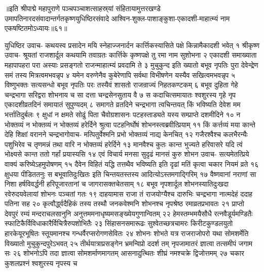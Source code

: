 ॥इति श्रीपाद्मे महापुराणे पञ्चपञ्चाशत्साहस्र्यां संहितायामुत्तरखण्डे उमापतिनारदसंवादान्तर्गतकृष्णयुधिष्ठिरसंवादे आश्विन-शुक्ल-पाशाङ्कुशा-एकादशी-माहात्म्यं नाम एकषष्टितमोऽध्यायः॥६१॥



युधिष्ठिर उवाच-
कथयस्व प्रसादेन मयि स्नेहाज्जनार्दन 
कार्त्तिकस्यासिते पक्षे किन्नामैकादशी भवेत् १
श्रीकृष्ण उवाच-
श्रूयतां राजशार्दूल कथयामि तवाग्रतः 
कार्त्तिके कृष्णपक्षे तु रमा नाम सुशोभना २
एकादशी समाख्याता महापापहरा परा 
अस्याः प्रसङ्गतो राजन्माहात्म्यं प्रवदामि ते ३
मुचुकुन्द इति ख्यातो बभूव नृपतिः पुरा 
देवेन्द्रेण समं तस्य मित्रत्वमभवन्नृप ४
यमेन वरुणेनैव कुबेरेणापि सर्वथा 
विभीषणेन यस्यैव सखित्वमभवन्नृप ५
विष्णुभक्तः सत्यसन्धो बभूव नृपतिः परः 
तस्यैवं शासतो राजन्राज्यं निहतकण्टकम् ६
बभूव दुहिता गेहे चन्द्रभागा सरिद्वरा 
शोभनाय च सा दत्ता चन्द्रसेनसुताय वै ७
स कदाचित्समायातः श्वशुरस्य गृहे नृप 
एकादशीव्रतदिनं समायातं सुपुण्यदम्  ८
समागते व्रतदिने चन्द्रभागा त्वचिन्तयत् 
किं भविष्यति देवेश मम भर्त्तातिदुर्बलः ९
क्षुधां न क्षमते सोढुं पिता चैवोग्रशासनः 
पटहस्ताड्यते यस्य सम्प्राप्ते दशमीदिने १०
न भोक्तव्यं न भोक्तव्यं न भोक्तव्यं हरेर्दिने 
श्रुत्वा पटहनिर्घोषं शोभनस्त्वब्रवीत्प्रियाम् ११
किं कर्त्तव्यं मया कान्ते देहि शिक्षां वरानने 
चन्द्रभागोवाच-
मत्पितुर्वेश्मनि प्रभो भोक्तव्यं नाद्य केनचित् १२
गजैरश्वैश्च कलभैरन्यैः पशुभिरेव  च 
तृणमन्नं तथा वारि न भोक्तव्यं हरेर्दिने १३
मानवैश्च कुतः कान्त भुज्यते हरिवासरे 
यदि त्वं भोक्ष्यसे कान्त ततो गर्हां प्रयास्यसि १४
एवं विचार्य मनसा सुदृढं मानसं कुरु 
शोभन उवाच-
सत्यमेतत्प्रिये वाक्यं करिष्येऽहमुपोषणम् १५
दैवेन विहितं यद्धि तत्तथैव भविष्यति 
इति दृढां मतिं कृत्वा चकार नियमं व्रते १६
क्षुधया पीडिततनुः स बभूवातिदुःखितः 
इति चिन्तयतस्तस्य आदित्योऽस्तमगाद्गिरिम् १७
वैष्णवानां नराणां सा निशा हर्षविवर्द्धनी 
हरिपूजारतानां च जागरासक्तचेतसाम् १८
बभूव नृपशार्दूल शोभनस्यातिदुःखदा 
रवेरुदयवेलायां शोभनः पञ्चतां गतः १९
दाहयामास राजा तं राजयोग्यैश्च दारुभिः 
चन्द्रभागा नात्मदेहं ददाह पतिना सह २०
कृत्वौर्द्ध्वदैहिकं तस्य तस्थौ जनकवेश्मनि 
शोभनश्च नृपश्रेष्ठ रमाव्रतप्रभावतः २१
प्राप्तो देवपुरं रम्यं मन्दराचलसानुनि 
अनुत्तममनाधृष्यमसङ्ख्येयगुणान्वितम् २२
हेमस्तम्भमयैसौधै रत्नवैडूर्यमण्डितैः 
स्फाटिकैर्विविधाकारैर्विचित्रैरुपशोभितैः २३
सिंहासनसमारूढः सुश्वेतच्छत्रचामरः 
किरीटकुण्डलयुतो हारकेयूरभूषितः 
स्तूयमानश्च गन्धर्वैरप्सरोगणसेवितः  २४
शोभनः शोभते यत्र राजराजोपरो यथा 
सोमशर्मेति विख्यातो मुचुकुन्दपुरेऽभवत् २५
तीर्थयात्राप्रसङ्गेन भ्रमन्विप्रो ददर्श तम् 
नृपजामातरं ज्ञात्वा तत्समीपं जगाम सः २६
शोभनोऽपि तदा ज्ञात्वा सोमशर्माणमागतम् 
आसनादुत्थितः शीघ्रं नमश्चक्रे द्विजोत्तमम् २७
चकार कुशलप्रश्नं श्वशुरस्य नृपस्य च 
